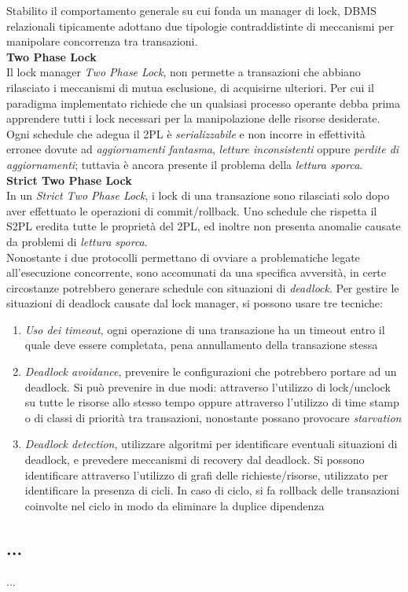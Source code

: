 \documentclass{article}
\begin{document}
Stabilito il comportamento generale su cui fonda un manager di lock, DBMS relazionali tipicamente adottano due tipologie contraddistinte di meccanismi per manipolare concorrenza tra transazioni.\vspace*{14pt}\\
\textbf{Two Phase Lock}\\
Il lock manager \textit{Two Phase Lock}, non permette a transazioni che abbiano rilasciato i meccanismi di mutua esclusione, di acquisirne ulteriori. Per cui il paradigma implementato richiede che un qualsiasi processo operante debba prima apprendere tutti i lock necessari per la manipolazione delle risorse desiderate. Ogni schedule che adegua il 2PL è \textit{serializzabile} e non incorre in effettività erronee dovute ad \textit{aggiornamenti fantasma}, \textit{letture inconsistenti} oppure \textit{perdite di aggiornamenti}; tuttavia è ancora presente il problema della \textit{lettura sporca}.\vspace*{14pt}\\
\textbf{Strict Two Phase Lock}\\
In un \textit{Strict Two Phase Lock}, i lock di una transazione sono rilasciati solo dopo aver effettuato le operazioni di commit/rollback.
Uno schedule che rispetta il S2PL eredita tutte le proprietà del 2PL, ed inoltre non presenta anomalie causate da problemi di \textit{lettura sporca}.\vspace{14pt}\\
Nonostante i due protocolli permettano di ovviare a problematiche legate all'esecuzione concorrente, sono accomunati da una specifica avversità, in certe circostanze potrebbero generare schedule con situazioni di \textit{deadlock}. Per gestire le situazioni di deadlock causate dal lock manager, si possono usare tre tecniche:
\begin{enumerate}[label={-}]
    \item \textit{Uso dei timeout}, ogni operazione di una transazione ha un timeout entro il quale deve essere completata, pena annullamento della transazione stessa
    \item \textit{Deadlock avoidance}, prevenire le configurazioni che potrebbero portare ad un deadlock. Si può prevenire in due modi: attraverso l'utilizzo di lock/unclock su tutte le risorse allo stesso tempo oppure attraverso l'utilizzo di time stamp o di classi di priorità tra transazioni, nonostante possano provocare \textit{starvation}
    \item \textit{Deadlock detection}, utilizzare algoritmi per identificare eventuali situazioni di deadlock, e prevedere meccanismi di recovery dal deadlock. Si possono identificare attraverso l'utilizzo di grafi delle richieste/risorse, utilizzato per identificare la presenza di cicli. In caso di ciclo, si fa rollback delle transazioni coinvolte nel ciclo in modo da eliminare la duplice dipendenza
\end{enumerate}

\subsection*{...}
\large
...
\end{document}
